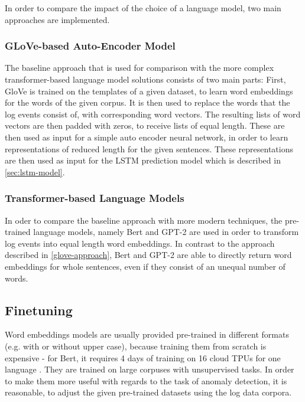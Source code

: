 In order to compare the impact of the choice of a language model, two main approaches are implemented.

\subsubsection{GLoVe-based Auto-Encoder Model \label{glove-approach}}
The baseline approach that is used for comparison with the more complex transformer-based language model solutions consists of two main parts: First, GloVe \cite{pennington2014glove} is trained on the templates of a given dataset, to learn word embeddings for the words of the given corpus. It is then used to replace the words that the log events consist of, with corresponding word vectors. The resulting lists of word vectors are then padded with zeros, to receive lists of equal length. These are then used as input for a simple auto encoder neural network, in order to learn representations of reduced length for the given sentences. These representations are then used as input for the LSTM prediction model which is described in \ref{sec:lstm-model}.

\subsubsection{Transformer-based Language Models \label{transformer-approach}}
In oder to compare the baseline approach with more modern techniques, the pre-trained language models, namely Bert and GPT-2 are used in order to transform log events into equal length word embeddings. In contrast to the approach described in \ref{glove-approach}, Bert and GPT-2 are able to directly return word embeddings for whole sentences, even if they consist of an unequal number of words.



\subsection{Finetuning\label{sec:finetuning}}
Word embeddings models are usually provided pre-trained in different formats (e.g. with or without upper case), because training them from scratch is expensive - for Bert, it requires 4 days of training on 16 cloud TPUs for one language \cite{googlebert}. They are trained on large corpuses with unsupervised tasks. In order to make them more useful with regards to the task of anomaly detection, it is reasonable, to adjust the given pre-trained datasets using the log data corpora.

